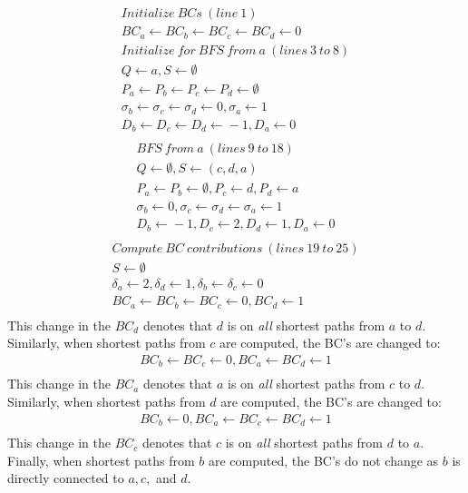 \begin{align*}
Initialize\ BCs\ (line\ 1)\\
BC_a\leftarrow{}BC_b\leftarrow{}BC_c\leftarrow{}BC_d\leftarrow{}0\\
Initialize\ for\ BFS\ from\ a\ (lines\ 3\ to\ 8) \\ 
Q \leftarrow{} a, S \leftarrow{} \emptyset{} \\
P_a\leftarrow{}P_b\leftarrow{}P_c\leftarrow{}P_d\leftarrow{}\emptyset{}\\
\sigma{}_b\leftarrow{}\sigma{}_c\leftarrow{}\sigma{}_d\leftarrow{}0, \sigma{}_a\leftarrow{}1\\
D_b\leftarrow{}D_c\leftarrow{}D_d\leftarrow{}-1, D_a\leftarrow{}0\\
\end{align*}
\begin{align*}
BFS\ from\ a\ (lines\ 9\ to\ 18)\\
Q \leftarrow{} \emptyset{}, S \leftarrow{} (c,d,a) \\
P_a\leftarrow{}P_b\leftarrow{}\emptyset{}, P_c\leftarrow{}d,P_d\leftarrow{}a\\
\sigma{}_b\leftarrow{}0,\sigma{}_c\leftarrow{}\sigma{}_d\leftarrow{}\sigma{}_a\leftarrow{}1\\
D_b\leftarrow{}-1,D_c\leftarrow{}2,D_d\leftarrow{}1,D_a\leftarrow{}0\\
\end{align*}
\begin{align*}
Compute\ BC\ contributions\ (lines\ 19\ to\ 25)\\
S\leftarrow{}\emptyset{}\\
\delta{}_a\leftarrow{}2,\delta{}_d\leftarrow{}1,\delta{}_b\leftarrow{}\delta{}_c\leftarrow{}0\\
BC_a\leftarrow{}BC_b\leftarrow{}BC_c\leftarrow{}0,BC_d\leftarrow{}1\\
\end{align*}
%
This change in the $BC_d$ denotes that $d$ is on \textit{all} shortest paths
from $a$ to $d$.
%
Similarly, when shortest paths from $c$ are computed, the BC's are changed 
to:
%
\begin{align*}
BC_b\leftarrow{}BC_c\leftarrow{}0,BC_a\leftarrow{}BC_d\leftarrow{}1\\
\end{align*}
%
This change in the $BC_a$ denotes that $a$ is on \textit{all} shortest paths
from $c$ to $d$.
%
Similarly, when shortest paths from $d$ are computed, the BC's are changed 
to:
%
\begin{align*}
BC_b\leftarrow{}0,BC_a\leftarrow{}BC_c\leftarrow{}BC_d\leftarrow{}1\\
\end{align*}
%
This change in the $BC_c$ denotes that $c$ is on \textit{all} shortest paths
from $d$ to $a$.
%
Finally, when shortest paths from $b$ are computed, the BC's do not change as 
$b$ is directly connected to $a,c,$ and $d$.

